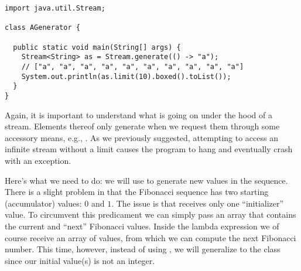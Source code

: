 \begin{lstlisting}[language=MyJava]
import java.util.Stream;

class AGenerator {

  public static void main(String[] args) {
    Stream<String> as = Stream.generate(() -> "a");
    // ["a", "a", "a", "a", "a", "a", "a", "a", "a", "a"]
    System.out.println(as.limit(10).boxed().toList()); 
  } 
}
\end{lstlisting}

Again, it is important to understand what is going on under the hood of a stream. Elements thereof only generate when we request them through some accessory means, e.g., . As we previously suggested, attempting to access an infinite stream without a limit causes the program to hang and eventually crash with an  exception.


Here's what we need to do: we will use  to generate new values in the sequence. There is a slight problem in that the Fibonacci sequence has two starting (accumulator) values: $0$ and $1$. The issue is that  receives only one ``initializer'' value. To circumvent this predicament we can simply pass an array that contains the current and ``next'' Fibonacci values. Inside the lambda expression we of course receive an array of values, from which we can compute the next Fibonacci number. This time, however, instead of using , we will generalize to the  class since our initial value(s) is not an integer.

